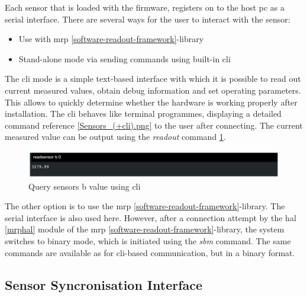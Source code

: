 Each sensor that is loaded with the firmware, registers on to the host
\gls{pc} as a serial interface. There are several ways for the user to
interact with the sensor:

\begin{itemize}
\tightlist
\item
  Use with \gls{mrp} \ref{software-readout-framework}-library
\item
  Stand-alone mode via sending commands using built-in \gls{cli}
\end{itemize}

The \gls{cli} mode is a simple text-based interface with which it is
possible to read out current measured values, obtain debug information
and set operating parameters. This allows to quickly determine whether
the hardware is working properly after installation. The \gls{cli}
behaves like terminal programmes, displaying a detailed command
reference \ref{Sensors_(+cli).png} to the user after connecting. The
current measured value can be output using the \emph{readout} command
\ref{Query_sensors_b_value_using_(+cli).png}.

\begin{figure}
\centering
\includegraphics{./generated_images/border_Query_sensors_b_value_using_(+cli).png}
\caption{Query sensors b value using \gls{cli}
\label{Query_sensors_b_value_using_(+cli).png}}
\end{figure}

The other option is to use the \gls{mrp}
\ref{software-readout-framework}-library. The serial interface is also
used here. However, after a connection attempt by the \gls{hal}
\ref{mrphal} module of the \gls{mrp}
\ref{software-readout-framework}-library, the system switches to binary
mode, which is initiated using the \emph{sbm} command. The same commands
are available as for \gls{cli}-based communication, but in a binary
format.

\hypertarget{sensor-syncronisation-interface}{%
\subsection{Sensor Syncronisation
Interface}\label{sensor-syncronisation-interface}}

